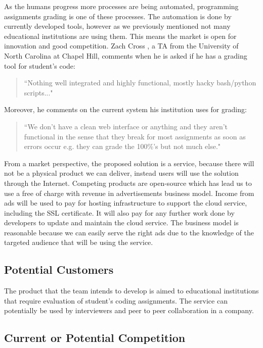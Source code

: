 
As the humans progress more processes are being automated, programming
assignments grading is one of these processes. The automation is done by
currently developed tools, however as we previously mentioned not many
educational institutions are using them. This means the market is open for
innovation and good competition. Zach Cross \cite{Zach}, a TA from the
University of North Carolina at Chapel Hill, comments when he is asked if he has
a grading tool for student's code: \begin{quote} ``Nothing well integrated and
highly functional, mostly hacky bash/python scripts..." \end{quote} Moreover, he
comments on the current system his institution uses for grading: \begin{quote}
``We don't have a clean web interface or anything and they aren't functional in
the sense that they break for most assignments as soon as errors occur e.g. they
can grade the 100\%'s but not much else." \end{quote}

From a market perspective, the proposed solution is a service, because there
will not be a physical product we can deliver, instead users will use the
solution through the Internet. Competing products are open-source which has lead
us to use a free of charge with revenue in advertisements business model. Income
from ads will be used to pay for hosting infrastructure to support the cloud
service, including the SSL certificate. It will also pay for any further work
done by developers to update and maintain the cloud service. The business model
is reasonable because we can easily serve the right ads due to the knowledge of
the targeted audience that will be using the service.

\subsection{Potential Customers}

The product that the team intends to develop is aimed to educational
institutions that require evaluation of student's coding assignments. The
service can potentially be used by interviewers and peer to peer collaboration
in a company.

\subsection{Current or Potential Competition}

